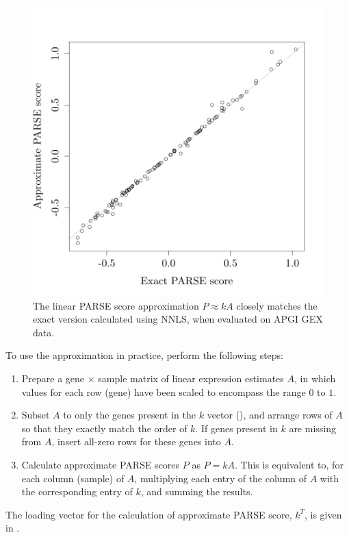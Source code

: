 \begin{figure}
\centering
\includegraphics[width=.7\linewidth]{analysis/biosurv/reports/18_SIS_diag_dsd_final/figure/approx-calc-1}
\caption[Performance of the \texorpdfstring{\acrshort{PARSE}}{PARSE} score approximation]{The linear \acrshort{PARSE} score approximation $P \approx k A$ closely matches the exact version calculated using \gls{NNLS}, when evaluated on \gls{APGI} \gls{GEX} data.}\label{fig:app-parse-approx-matching}
\end{figure}

To use the approximation in practice, perform the following steps:
\begin{enumerate}
  \item Prepare a gene $\times$ sample matrix of linear expression estimates $A$, in which values for each row (gene) have been scaled to encompass the range $0$ to $1$.
  \item Subset $A$ to only the genes present in the $k$ vector (), and arrange rows of $A$ so that they exactly match the order of $k$.  If genes present in $k$ are missing from $A$, insert all-zero rows for these genes into $A$.
  \item Calculate approximate \gls{PARSE} scores $P$ as $P = k A$.  This is equivalent to, for each column (sample) of $A$, multiplying each entry of the column of $A$ with the corresponding entry of $k$, and summing the results.
\end{enumerate}

The loading vector for the calculation of approximate \gls{PARSE} score, $k^T$, is given in .

